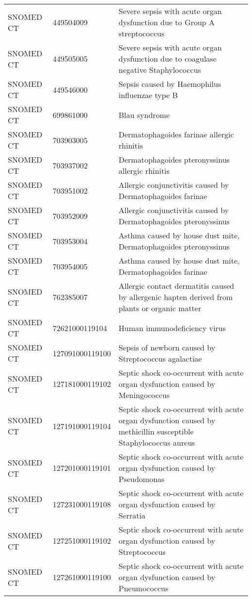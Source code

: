 \begin{longtable}{p{}p{}p{}}
  SNOMED CT & 449504009 & Severe sepsis with acute organ dysfunction due to Group A streptococcus \\ 
  SNOMED CT & 449505005 & Severe sepsis with acute organ dysfunction due to coagulase negative Staphylococcus \\ 
  SNOMED CT & 449546000 & Sepsis caused by Haemophilus influenzae type B \\ 
  SNOMED CT & 699861000 & Blau syndrome \\ 
  SNOMED CT & 703903005 & Dermatophagoides farinae allergic rhinitis \\ 
  SNOMED CT & 703937002 & Dermatophagoides pteronyssinus allergic rhinitis \\ 
  SNOMED CT & 703951002 & Allergic conjunctivitis caused by Dermatophagoides farinae \\ 
  SNOMED CT & 703952009 & Allergic conjunctivitis caused by Dermatophagoides pteronyssinus \\ 
  SNOMED CT & 703953004 & Asthma caused by house dust mite, Dermatophagoides pteronyssinus \\ 
  SNOMED CT & 703954005 & Asthma caused by house dust mite, Dermatophagoides farinae \\ 
  SNOMED CT & 762385007 & Allergic contact dermatitis caused by allergenic hapten derived from plants or organic matter \\ 
  SNOMED CT & 72621000119104 & Human immunodeficiency virus \\ 
  SNOMED CT & 127091000119100 & Sepsis of newborn caused by Streptococcus agalactiae \\ 
  SNOMED CT & 127181000119102 & Septic shock co-occurrent with acute organ dysfunction caused by Meningococcus \\ 
  SNOMED CT & 127191000119104 & Septic shock co-occurrent with acute organ dysfunction caused by methicillin susceptible Staphylococcus aureus \\ 
  SNOMED CT & 127201000119101 & Septic shock co-occurrent with acute organ dysfunction caused by Pseudomonas \\ 
  SNOMED CT & 127231000119108 & Septic shock co-occurrent with acute organ dysfunction caused by Serratia \\ 
  SNOMED CT & 127251000119102 & Septic shock co-occurrent with acute organ dysfunction caused by Streptococcus \\ 
  SNOMED CT & 127261000119100 & Septic shock co-occurrent with acute organ dysfunction caused by Pneumococcus \\ 

\end{longtable}
